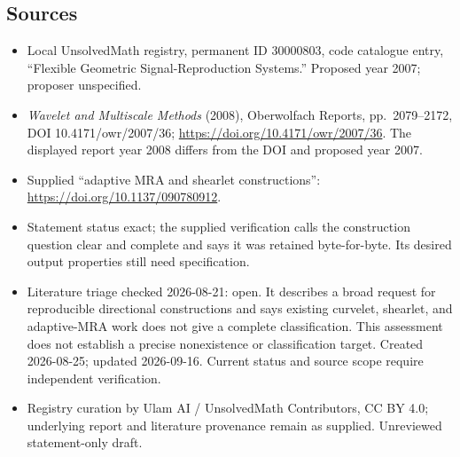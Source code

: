 \documentclass[11pt]{article}
\begin{document}
\subsection{Sources}
\begin{itemize}
\item Local UnsolvedMath registry, permanent ID 30000803, code catalogue entry, ``Flexible Geometric Signal-Reproduction Systems.'' Proposed year 2007; proposer unspecified.
\item \emph{Wavelet and Multiscale Methods} (2008), Oberwolfach Reports, pp.\ 2079--2172, DOI 10.4171/owr/2007/36; \url{https://doi.org/10.4171/owr/2007/36}. The displayed report year 2008 differs from the DOI and proposed year 2007.
\item Supplied ``adaptive MRA and shearlet constructions'': \url{https://doi.org/10.1137/090780912}.
\item Statement status exact; the supplied verification calls the construction question clear and complete and says it was retained byte-for-byte. Its desired output properties still need specification.
\item Literature triage checked 2026-08-21: open. It describes a broad request for reproducible directional constructions and says existing curvelet, shearlet, and adaptive-MRA work does not give a complete classification. This assessment does not establish a precise nonexistence or classification target. Created 2026-08-25; updated 2026-09-16. Current status and source scope require independent verification.
\item Registry curation by Ulam AI / UnsolvedMath Contributors, CC BY 4.0; underlying report and literature provenance remain as supplied. Unreviewed statement-only draft.
\end{itemize}
\end{document}
